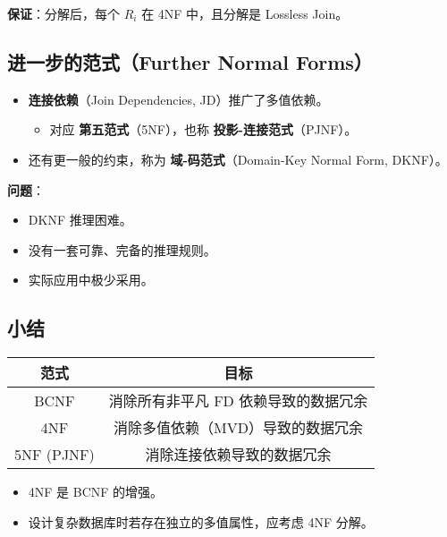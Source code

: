 \textbf{保证}：分解后，每个 $R_i$ 在 4NF 中，且分解是 Lossless Join。

\subsection{进一步的范式（Further Normal Forms）}

\begin{itemize}
    \item \textbf{连接依赖}（Join Dependencies, JD）推广了多值依赖。
    \begin{itemize}
        \item 对应 \textbf{第五范式}（5NF），也称 \textbf{投影-连接范式}（PJNF）。
    \end{itemize}
    \item 还有更一般的约束，称为 \textbf{域-码范式}（Domain-Key Normal Form, DKNF）。
\end{itemize}

\textbf{问题}：

\begin{itemize}
    \item DKNF 推理困难。
    \item 没有一套可靠、完备的推理规则。
    \item 实际应用中极少采用。
\end{itemize}

\subsection{小结}

\begin{tabular}{|c|c|}
\hline
\textbf{范式} & \textbf{目标} \\
\hline
BCNF & 消除所有非平凡 FD 依赖导致的数据冗余 \\
4NF & 消除多值依赖（MVD）导致的数据冗余 \\
5NF (PJNF) & 消除连接依赖导致的数据冗余 \\
\hline
\end{tabular}

\begin{itemize}
    \item 4NF 是 BCNF 的增强。
    \item 设计复杂数据库时若存在独立的多值属性，应考虑 4NF 分解。
\end{itemize}
